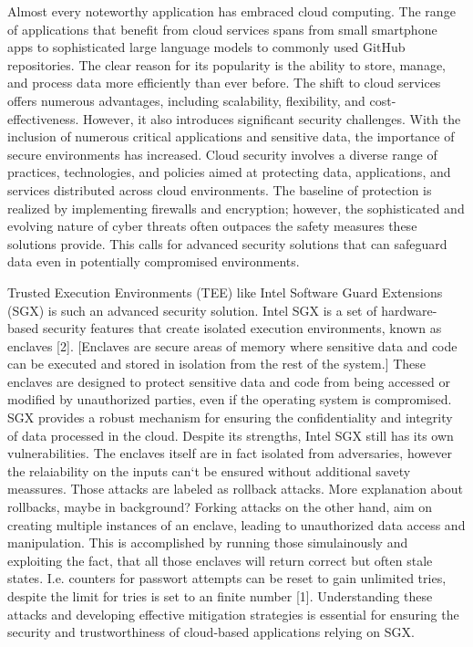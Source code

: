 
Almost every noteworthy application has embraced cloud computing. The range of applications that benefit from cloud services spans from small smartphone 
apps to sophisticated large language models to commonly used GitHub repositories. The clear reason for its popularity is the ability to store, manage, 
and process data more efficiently than ever before. The shift to cloud services offers numerous advantages, including scalability, flexibility, and cost-effectiveness. 
However, it also introduces significant security challenges. With the inclusion of numerous critical applications and sensitive data, the importance of secure environments has increased.
Cloud security involves a diverse range of practices, technologies, and policies aimed at protecting data, applications, and services distributed across cloud environments. 
The baseline of protection is realized by implementing firewalls and encryption; however, the sophisticated and evolving nature of cyber threats often outpaces 
the safety measures these solutions provide. This calls for advanced security solutions that can safeguard data even in potentially compromised environments.

Trusted Execution Environments (TEE) like Intel Software Guard Extensions (SGX) is such an advanced security solution. Intel SGX is a set of hardware-based security features 
that create isolated execution environments, known as enclaves [2]. 
[Enclaves are secure areas of memory where sensitive data and code can be executed and stored in isolation from the rest of the system.] 
These enclaves are designed to protect sensitive data and code from being accessed or modified by unauthorized parties, even if the operating system is compromised. 
SGX provides a robust mechanism for ensuring the confidentiality and integrity of data processed in the cloud.
Despite its strengths, Intel SGX still has its own vulnerabilities. The enclaves itself are in fact isolated from adversaries, 
however the relaiability on the inputs can‘t be ensured without additional savety meassures. Those attacks are labeled as rollback attacks. {More explanation about rollbacks, maybe in background?}
Forking attacks on the other hand, aim on creating multiple instances of an enclave, leading to unauthorized data access and manipulation.
This is accomplished by running those simulainously and exploiting the fact, that all those enclaves will return correct but often stale states. 
I.e. counters for passwort attempts can be reset to gain unlimited tries, despite the limit for tries is set to an finite number [1].
Understanding these attacks and developing effective mitigation strategies is essential for ensuring the security and trustworthiness of cloud-based applications relying on SGX.
